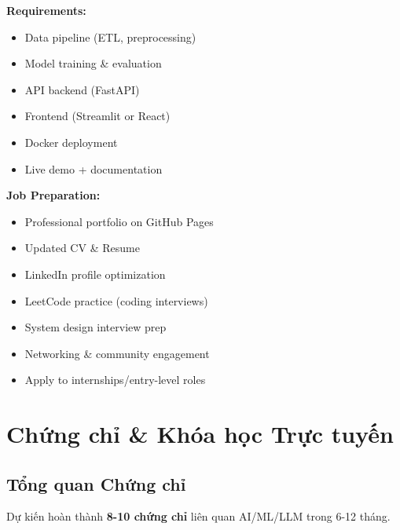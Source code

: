 \documentclass[12pt,a4paper]{article}
\begin{document}
\textbf{Requirements:}
\begin{itemize}
    \item Data pipeline (ETL, preprocessing)
    \item Model training \& evaluation
    \item API backend (FastAPI)
    \item Frontend (Streamlit or React)
    \item Docker deployment
    \item Live demo + documentation
\end{itemize}

\textbf{Job Preparation:}
\begin{itemize}
    \item Professional portfolio on GitHub Pages
    \item Updated CV \& Resume
    \item LinkedIn profile optimization
    \item LeetCode practice (coding interviews)
    \item System design interview prep
    \item Networking \& community engagement
    \item Apply to internships/entry-level roles
\end{itemize}

\newpage


\section{Chứng chỉ \& Khóa học Trực tuyến}

\subsection{Tổng quan Chứng chỉ}

Dự kiến hoàn thành \textbf{8-10 chứng chỉ} liên quan AI/ML/LLM trong 6-12 tháng.
\end{document}
